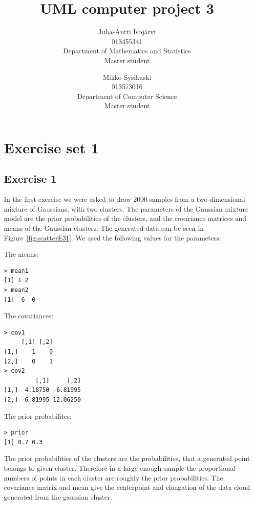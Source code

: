 \documentclass{article}
\begin{document}
\title{UML computer project 3}
\author{
Juha-Antti Isojärvi\\
013455341 \\
Department of Mathematics and Statistics\\
Master student
\and
Mikko Sysikaski\\
013573016\\
Department of Computer Science\\
Master student}
\date{}
\maketitle

\section{Exercise set 1}

\subsection{Exercise 1}
In the first exercise we were asked to draw 2000 samples from a
two-dimensional mixture of Gaussians, with two clusters. The
parameters of the Gaussian mixture model are the prior probabilities
of the clusters, and the covariance matrices and means of the Gaussian
clusters. The generated data can be seen in
Figure~\ref{fig:scatterE31}. We used the following values for the
parameters:

\noindent The means: 
\begin{verbatim}
> mean1
[1] 1 2
> mean2
[1] -6  0
\end{verbatim}

\noindent The covariances:
\begin{verbatim}
> cov1
     [,1] [,2]
[1,]    1    0
[2,]    0    1
> cov2
         [,1]     [,2]
[1,]  4.18750 -6.81995
[2,] -6.81995 12.06250
\end{verbatim}

\noindent The prior probabilites: 
\begin{verbatim}
> prior
[1] 0.7 0.3
\end{verbatim}

The prior probabilities of the clusters are the probabilities, that a
generated point belongs to given cluster. Therefore in a large enough
sample the proportional numbers of points in each cluster are roughly
the prior probabilities. The covariance matrix and mean give the
centerpoint and elongation of the data cloud generated from the
gaussian cluster. 
\end{document}
